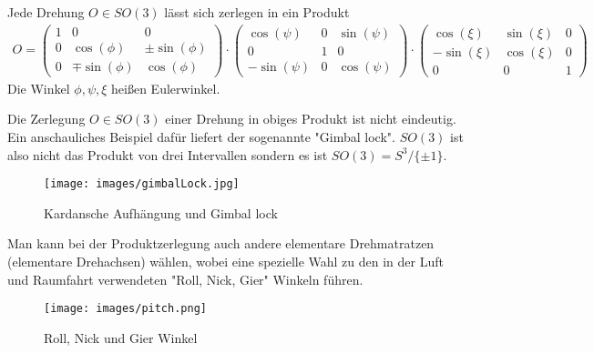 \begin{Satz}
Jede Drehung  $O \in SO(3)$  lässt sich zerlegen in ein Produkt
\begin{align*}
O = 
\begin{pmatrix}
1 & 0 & 0 \\
0 & \cos(\phi) & \pm \sin(\phi) \\ 
 0 & \mp \sin(\phi) & \cos(\phi)
\end{pmatrix}
\cdot
\begin{pmatrix}
 \cos(\psi) & 0 &   \sin(\psi) \\ 
0 & 1 & 0 \\ 
- \sin(\psi) & 0& \cos(\psi)
\end{pmatrix}
\cdot \begin{pmatrix}
 \cos(\xi) &  \sin(\xi)  & 0\\ 
 - \sin(\xi) & \cos(\xi) & 0 \\
0 & 0 & 1 
\end{pmatrix} 
\end{align*} 
Die Winkel $\phi, \psi, \xi$ heißen  Eulerwinkel. 
\end{Satz}

\begin{Bemerkung}
Die  Zerlegung  $O \in SO(3)$  einer Drehung in obiges Produkt ist  nicht eindeutig.
Ein anschauliches Beispiel dafür liefert der sogenannte "Gimbal lock". $SO(3)$ ist also nicht das Produkt von drei Intervallen sondern
es ist $SO(3) = S^{3}/ \{ \pm 1 \}$.
\end{Bemerkung}

\begin{figure}[H]
    \centering
    \texttt{[image: images/gimbalLock.jpg]}
    \caption{Kardansche Aufhängung und Gimbal lock}
    \label{fig:gimbal+lock}
\end{figure}

\begin{Bemerkung}
Man kann bei der Produktzerlegung auch andere elementare Drehmatratzen (elementare Drehachsen)  wählen, wobei
eine spezielle Wahl  zu den in der Luft und Raumfahrt verwendeten "Roll, Nick, Gier" Winkeln führen.
\end{Bemerkung}

\begin{figure}[H]
    \centering
    \texttt{[image: images/pitch.png]}
    \caption{Roll, Nick und Gier Winkel}
    \label{fig:roll-pitch-yaw}
\end{figure}

